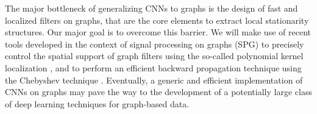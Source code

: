 \documentclass{article}
\begin{document}
The major bottleneck of generalizing CNNs to graphs is the design of fast and localized filters on graphs, that are the core elements to extract local stationarity structures. Our major goal is to overcome this barrier. We will make use of recent tools developed in the context of signal processing on graphs (SPG) \cite{art:ShumanNarangFrossardOrtegaVandergheynst13ReviewSPG} to precisely control the spatial support of graph filters using the so-called polynomial kernel localization \cite{art:ShumanRicaudVandergheynst16Local}, and to perform an efficient backward propagation technique using the Chebyshev technique \cite{art:HenaffBrunaLeCun15DLgraphs}. Eventually, a generic and efficient implementation of CNNs on graphs may pave the way to the development of a potentially large class of deep learning techniques for graph-based data. 
  
\end{document}
